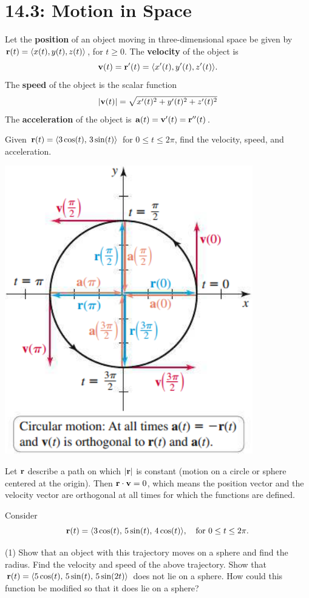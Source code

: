 \documentclass[mathNotesPreamble]{subfiles}
\begin{document}
\section{14.3: Motion in Space}
  \begin{defn*}
    Let the \textbf{position} of an object moving in three-dimensional space be given by \newline${\mathbf{r}}(t)={\left\langle x(t),y(t),z(t) \right\rangle}$, for $t\geq 0$. The \textbf{velocity} of the object is
      \[{\mathbf{v}}(t)={\mathbf{r}}'(t)={\left\langle x'(t),y'(t),z'(t) \right\rangle}.\]
    The \textbf{speed} of the object is the scalar function
      \[{\left\vert{\mathbf{v}}(t)\right\vert}=\sqrt{x'(t)^2+y'(t)^2+z'(t)^2}\]
    The \textbf{acceleration} of the object is $\mathbf a(t)={\mathbf{v}}'(t)={\mathbf{r}}''(t)$.
  \end{defn*}
  \begin{ex*}
    Given ${\mathbf{r}}(t)={\left\langle 3\cos(t),\,3\sin(t) \right\rangle}$ for $0\leq t\leq 2\pi$, find the velocity, speed, and acceleration.
  \end{ex*}
  \begin{flushright}
    \includegraphics[width=0.35\linewidth]{images/briggs_14_03/fig14_13}
  \end{flushright}
  \pagebreak

  \begin{thmBox*}
    Let ${\mathbf{r}}$ describe a path on which ${\left\vert{\mathbf{r}}\right\vert}$ is constant (motion on a circle or sphere centered at the origin). Then ${\mathbf{r}}\cdot{\mathbf{v}}=0$, which means the position vector and the velocity vector are orthogonal at all times for which the functions are defined. 
  \end{thmBox*}

  \begin{ex*}
    Consider
      \[{\mathbf{r}}(t)={\left\langle 3\cos(t),\,5\sin(t),\,4\cos(t) \right\rangle},\quad\textnormal{for } 0\leq t\leq 2\pi.\]
  \end{ex*}
  \begin{tasks}[after-item-skip=\stretch{1}](1)
    \task Show that an object with this trajectory moves on a sphere and find the radius.
    \task Find the velocity and speed of the above trajectory.
    \task Show that ${\mathbf{r}}(t)={\left\langle 5\cos(t),\,5\sin(t),\,5\sin(2t) \right\rangle}$ does not lie on a sphere. How could this function be modified so that it does lie on a sphere?
  \end{tasks}
  \pagebreak
\end{document}
